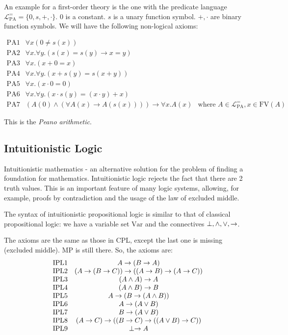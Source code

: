 An example for a first-order theory is the one with the predicate language $\mathcal{L}_\mathrm{PA}^= = \{0, s, +, \cdot\}$.
$0$ is a constant. $s$ is a unary function symbol. $+, \cdot$ are binary function symbols. 
We will have the following non-logical axioms:

\[
\begin{array}{ccc}
\text{PA1}& \forall x (0 \neq s(x))& \\
\text{PA2}& \forall x. \forall y. (s(x) = s(y) \to x = y)& \\
\text{PA3}& \forall x.(x + 0 = x)& \\
\text{PA4}& \forall x. \forall y. (x + s(y) = s(x+y))&\\
\text{PA5}& \forall x. (x \cdot 0 = 0)&\\
\text{PA6}& \forall x. \forall y. (x \cdot s(y) = (x \cdot y) + x) &\\
\text{PA7}& (A(0) \wedge (\forall A(x) \to A(s(x)))) \to \forall x. A(x)& \text{where~} A \in \mathcal{L}_\mathrm{PA}^=, x\in \mathrm{FV}(A)
\end{array}
\]

This is the \emph{Peano arithmetic}.

\subsection{Intuitionistic Logic}
Intuitionistic mathematics - an alternative solution for the problem of finding a foundation for mathematics.
Intuitionistic logic rejects the fact that there are 2 truth values. This is an important feature
of many logic systems, allowing, for example, proofs by contradiction and the usage of the law of excluded middle.

The syntax of intuitionistic propositional logic is similar to that of classical propositional logic:
we have a variable set $\mathrm{Var}$ and the connectives $\perp, \wedge, \vee, \to$.

The axioms are the same as those in CPL, except the last one is missing (excluded middle). MP is still there. 
So, the axioms are:
\[
\begin{array}{cc}
\text{IPL1}& A \to (B \to A)\\
\text{IPL2}& (A \to (B \to C)) \to ((A \to B) \to (A \to C))\\
\text{IPL3}& (A \wedge A) \to A\\
\text{IPL4}& (A \wedge B) \to B\\
\text{IPL5}& A \to (B \to (A \wedge B))\\
\text{IPL6}& A \to (A \vee B)\\
\text{IPL7}& B \to (A \vee B)\\
\text{IPL8}& (A \to C) \to ((B \to C) \to ((A \vee B) \to C))\\
\text{IPL9}& \perp \to A\\
\end{array}
\]

